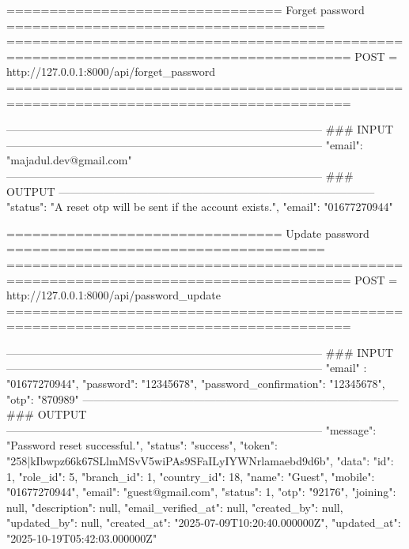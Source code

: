 

================================ Forget password =====================================
======================================================================================
POST	= http://127.0.0.1:8000/api/forget_password
======================================================================================

--------------------------------------------------------------------------------------
### INPUT
--------------------------------------------------------------------------------------
{
  "email": "majadul.dev@gmail.com"
}
--------------------------------------------------------------------------------------
### OUTPUT
--------------------------------------------------------------------------------------
{
  "status": "A reset otp will be sent if the account exists.",
  "email": "01677270944"
}



================================ Update password =====================================
======================================================================================
POST	= http://127.0.0.1:8000/api/password_update
======================================================================================

--------------------------------------------------------------------------------------
### INPUT
--------------------------------------------------------------------------------------
{
  "email" : "01677270944",
  "password": "12345678",
  "password_confirmation": "12345678",
  "otp": "870989"
}
--------------------------------------------------------------------------------------
### OUTPUT
--------------------------------------------------------------------------------------
{
  "message": "Password reset successful.",
  "status": "success",
  "token": "258|kIbwpz66k67SLlmMSvV5wiPAs9SFaILyIYWNrlamaebd9d6b",
  "data": {
    "id": 1,
    "role_id": 5,
    "branch_id": 1,
    "country_id": 18,
    "name": "Guest",
    "mobile": "01677270944",
    "email": "guest@gmail.com",
    "status": 1,
    "otp": "92176",
    "joining": null,
    "description": null,
    "email_verified_at": null,
    "created_by": null,
    "updated_by": null,
    "created_at": "2025-07-09T10:20:40.000000Z",
    "updated_at": "2025-10-19T05:42:03.000000Z"
  }
}

